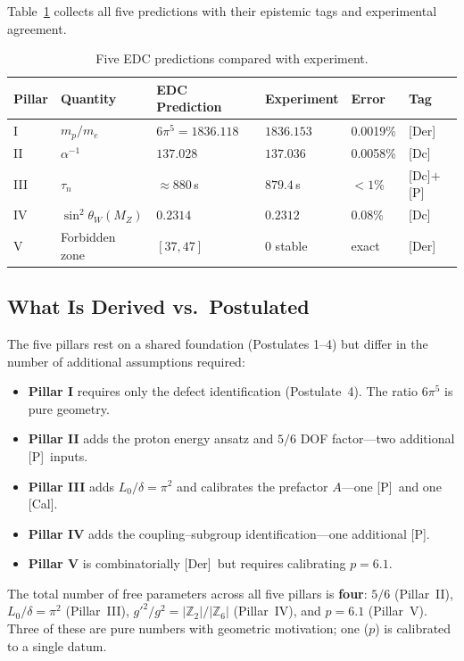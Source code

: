 \documentclass[12pt,a4paper]{article}
\theoremstyle{definition}
\theoremstyle{remark}
\newcommand{\tagDer}{\textsf{[Der]}}
\newcommand{\tagDc}{\textsf{[Dc]}}
\newcommand{\tagP}{\textsf{[P]}}
\newcommand{\tagCal}{\textsf{[Cal]}}
\newcommand{\stw}{\sin^2\!\theta_W}
\newcommand{\Zn}[1]{\mathbb{Z}_{#1}}
\begin{document}
Table~\ref{tab:summary} collects all five predictions with their
epistemic tags and experimental agreement.

\begin{table}[h]
\centering
\caption{Five EDC predictions compared with experiment.}
\label{tab:summary}
\begin{tabular}{@{}llllll@{}}
\toprule
Pillar & Quantity & EDC Prediction & Experiment & Error & Tag \\
\midrule
I   & $m_p/m_e$    & $6\pi^5 = 1836.118$ & $1836.153$ & 0.0019\% & \tagDer \\
II  & $\alpha^{-1}$ & $137.028$ & $137.036$ & 0.0058\% & \tagDc \\
III & $\tau_n$      & $\approx 880$\,s & $879.4$\,s & $<1$\% & \tagDc$+$\tagP \\
IV  & $\stw(M_Z)$  & $0.2314$ & $0.2312$ & 0.08\% & \tagDc \\
V   & Forbidden zone & $[37,47]$ & 0 stable & exact & \tagDer \\
\bottomrule
\end{tabular}
\end{table}

\subsection{What Is Derived vs.\ Postulated}

The five pillars rest on a shared foundation (Postulates 1--4) but
differ in the number of additional assumptions required:

\begin{itemize}[nosep]
\item \textbf{Pillar I} requires only the defect identification
  (Postulate~4).  The ratio $6\pi^5$ is pure geometry.
\item \textbf{Pillar II} adds the proton energy ansatz and
  $5/6$ DOF factor---two additional \tagP\ inputs.
\item \textbf{Pillar III} adds $L_0/\delta = \pi^2$ and calibrates
  the prefactor $A$---one \tagP\ and one \tagCal.
\item \textbf{Pillar IV} adds the coupling--subgroup
  identification---one additional \tagP.
\item \textbf{Pillar V} is combinatorially \tagDer\ but requires
  calibrating $p = 6.1$.
\end{itemize}

The total number of free parameters across all five pillars is
\textbf{four}: $5/6$ (Pillar~II), $L_0/\delta = \pi^2$
(Pillar~III), $g'^2/g^2 = |\Zn{2}|/|\Zn{6}|$ (Pillar~IV), and
$p = 6.1$ (Pillar~V).  Three of these are pure numbers with
geometric motivation; one ($p$) is calibrated to a single datum.
\end{document}
